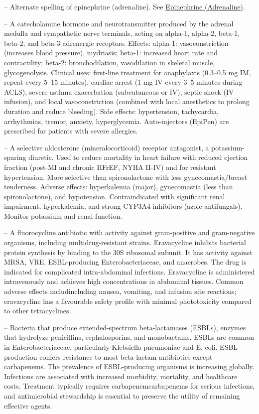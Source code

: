 -- Alternate spelling of epinephrine (adrenaline). See \hyperlink{Epinephrine (Adrenaline)}{Epinephrine (Adrenaline)}.

-- A catecholamine hormone and neurotransmitter produced by the adrenal medulla and sympathetic nerve terminals, acting on alpha-1, alpha-2, beta-1, beta-2, and beta-3 adrenergic receptors. Effects: alpha-1: vasoconstriction (increases blood pressure), mydriasis; beta-1: increased heart rate and contractility; beta-2: bronchodilation, vasodilation in skeletal muscle, glycogenolysis. Clinical uses: first-line treatment for anaphylaxis (0.3--0.5 mg IM, repeat every 5--15 minutes), cardiac arrest (1 mg IV every 3--5 minutes during ACLS), severe asthma exacerbation (subcutaneous or IV), septic shock (IV infusion), and local vasoconstriction (combined with local anesthetics to prolong duration and reduce bleeding). Side effects: hypertension, tachycardia, arrhythmias, tremor, anxiety, hyperglycemia. Auto-injectors (EpiPen) are prescribed for patients with severe allergies.

-- A selective aldosterone (mineralocorticoid) receptor antagonist, a potassium-sparing diuretic. Used to reduce mortality in heart failure with reduced ejection fraction (post-MI and chronic HFrEF, NYHA II-IV) and for resistant hypertension. More selective than spironolactone with less gynecomastia/breast tenderness. Adverse effects: hyperkalemia (major), gynecomastia (less than spironolactone), and hypotension. Contraindicated with significant renal impairment, hyperkalemia, and strong CYP3A4 inhibitors (azole antifungals). Monitor potassium and renal function.

-- A fluorocycline antibiotic with activity against gram-positive and gram-negative organisms, including multidrug-resistant strains. Eravacycline inhibits bacterial protein synthesis by binding to the 30S ribosomal subunit. It has activity against MRSA, VRE, ESBL-producing Enterobacteriaceae, and anaerobes. The drug is indicated for complicated intra-abdominal infections. Eravacycline is administered intravenously and achieves high concentrations in abdominal tissues. Common adverse effects includincluding nausea, vomiting, and infusion site reactions; eravacycline has a favourable safety profile with minimal phototoxicity compared to other tetracyclines.

-- Bacteria that produce extended-spectrum beta-lactamases (ESBLs), enzymes that hydrolyze penicillins, cephalosporins, and monobactams. ESBLs are common in Enterobacteriaceae, particularly Klebsiella pneumoniae and E. coli. ESBL production confers resistance to most beta-lactam antibiotics except carbapenems. The prevalence of ESBL-producing organisms is increasing globally. Infections are associated with increased morbidity, mortality, and healthcare costs. Treatment typically requires carbapenemcarbapenems for serious infections, and antimicrobial stewardship is essential to preserve the utility of remaining effective agents.

